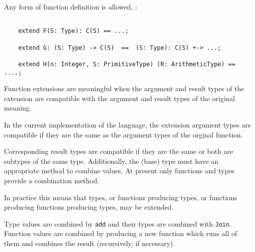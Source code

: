 Any form of function definition is allowed, \eg{}:
\begin{small}
\begin{verbatim}

    extend F(S: Type): C(S) == ...;

    extend G: (S: Type) -> C(S)  ==  (S: Type): C(S) +-> ...;

    extend H(n: Integer, S: PrimitiveType) (R: ArithmeticType) == ....;
\end{verbatim}
\end{small}

Function extensions are meaningful when the argument and result types of
the extension are compatible with the argument and result types
of the original meaning.  

In the current implementation of the language, the extension
argument types are compatible if they are the same as
the argument types of the orginal function.

Corresponding result types are compatible if they are the same
or both are subtypes of the same type.
Additionally, the (base) type must have an appropriate method to combine values.
At present only functions and types provide a combination method.

In practice this means that types, or functions producing types, 
or functions producing functions producing types, \etc{} may be extended.

Type values are combined by \verb"add" and their types are combined
with \verb"Join".
Function values are combined by producing a new function which
runs all of them and combines the result (recursively, if necessary).

